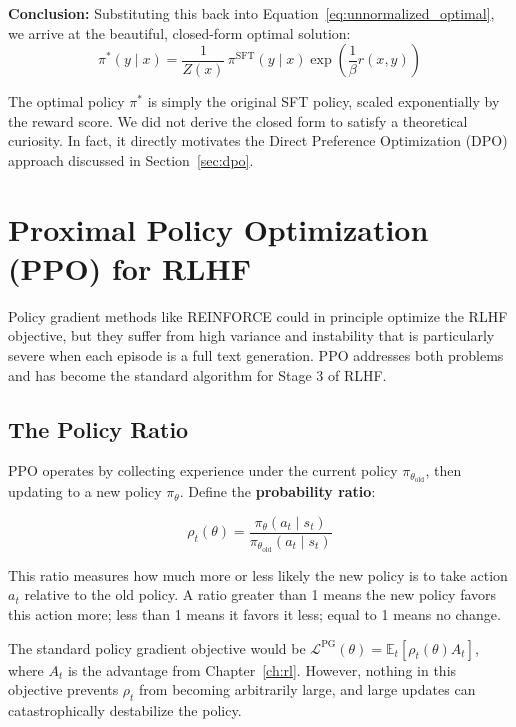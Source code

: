 \documentclass{book}
\begin{document}
\textbf{Conclusion:}
Substituting this back into Equation~\ref{eq:unnormalized_optimal}, we arrive at the beautiful, closed-form optimal solution:
\begin{equation}
\label{eq:kl_optimal}
\pi^*(y \mid x)
= \frac{1}{Z(x)}\, \pi^{\text{SFT}}(y \mid x)
    \exp\!\left(\frac{1}{\beta} r(x, y)\right)
\end{equation}

The optimal policy $\pi^*$ is simply the original SFT policy, scaled exponentially by the reward score. We did not derive the closed form to satisfy a theoretical curiosity. In fact, it directly motivates the Direct Preference Optimization (DPO) approach discussed in Section~\ref{sec:dpo}.

\section{Proximal Policy Optimization (PPO) for RLHF}
\label{sec:ppo_rlhf}

Policy gradient methods like REINFORCE could in principle optimize the
RLHF objective, but they suffer from high variance and instability that
is particularly severe when each episode is a full text generation. PPO
addresses both problems~\cite{schulman2017} and has become the standard
algorithm for Stage 3 of RLHF.

\subsection{The Policy Ratio}
\label{sec:policy_ratio}

PPO operates by collecting experience under the current policy
$\pi_{\theta_{\text{old}}}$, then updating to a new policy $\pi_\theta$.
Define the \textbf{probability ratio}:

\begin{equation}
\label{eq:policy_ratio}
\rho_t(\theta)
= \frac{\pi_\theta(a_t \mid s_t)}{\pi_{\theta_{\text{old}}}(a_t \mid s_t)}
\end{equation}

This ratio measures how much more or less likely the new policy is to take
action $a_t$ relative to the old policy. A ratio greater than 1 means the
new policy favors this action more; less than 1 means it favors it less;
equal to 1 means no change.

The standard policy gradient objective would be $\mathcal{L}^{\text{PG}}
(\theta) = \mathbb{E}_t[\rho_t(\theta) A_t]$, where $A_t$ is the advantage
from Chapter~\ref{ch:rl}. However, nothing in this objective prevents
$\rho_t$ from becoming arbitrarily large, and large updates can
catastrophically destabilize the policy.
\end{document}
